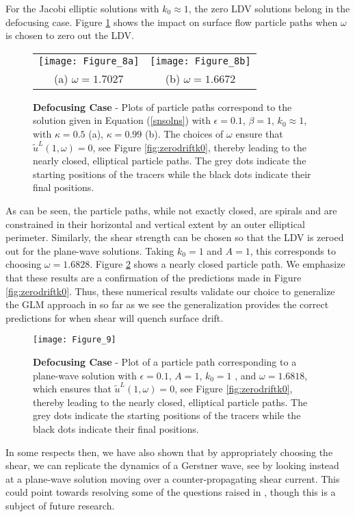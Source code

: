 \documentclass{JFM_Style/jfm}
\begin{document}
For the Jacobi elliptic solutions with $k_{0}\approx 1$, the zero LDV solutions belong in the defocusing case.  Figure \ref{fig:jaczerodrift} shows the impact on surface flow particle paths when $\omega$ is chosen to zero out the LDV.
\begin{figure}
\centering
\begin{tabular}{cc}
\texttt{[image: Figure\_8a]} & \texttt{[image: Figure\_8b]} \\
(a) $\omega=1.7027$ & (b) $\omega=1.6672$
\end{tabular}
\caption{\small {\bf Defocusing Case} - Plots of particle paths correspond to the solution given in Equation (\ref{snsolns}) with $\epsilon=0.1$, $\beta=1$, $k_{0}\approx 1$, with $\kappa=0.5$  (a), $\kappa=0.99$ (b). The choices of $\omega$ ensure that $\tilde{u}^{L}(1,\omega)=0$, see Figure \ref{fig:zerodriftk0}, thereby leading to the nearly closed, elliptical particle paths.  The grey dots indicate the starting positions of the tracers while the black dots indicate their final positions.  }
\label{fig:jaczerodrift}
\end{figure}
As can be seen, the particle paths, while not exactly closed, are spirals and are constrained in their horizontal and vertical extent by an outer elliptical perimeter.  Similarly, the shear strength can be chosen so that the LDV is zeroed out for the plane-wave solutions.  Taking $k_{0}=1$ and $A=1$, this corresponds to choosing $\omega = 1.6828$.  Figure \ref{fig:pwavezdrift} shows a nearly closed particle path.  We emphasize that these results are a confirmation of the predictions made in Figure \ref{fig:zerodriftk0}.  Thus, these numerical results validate our choice to generalize the GLM approach in so far as we see the generalization provides the correct predictions for when shear will quench surface drift.
\begin{figure}
\centering
\texttt{[image: Figure\_9]}
\caption{\small {\bf Defocusing Case} - Plot of a particle path corresponding to a plane-wave solution with $\epsilon=0.1$, $A=1$, $k_{0}=1$ , and $\omega=1.6818$, which ensures that $\tilde{u}^{L}(1,\omega)=0$, see Figure \ref{fig:zerodriftk0}, thereby leading to the nearly closed, elliptical particle paths.  The grey dots indicate the starting positions of the tracers while the black dots indicate their final positions.  }
\label{fig:pwavezdrift}
\end{figure}

In some respects then, we have also shown that by appropriately choosing the shear, we can replicate the dynamics of a Gerstner wave, see \cite{constantin} by looking instead at a plane-wave solution moving over a counter-propagating shear current.  This could point towards resolving some of the questions raised in \cite{monismith,smith}, though this is a subject of future research.
\end{document}
